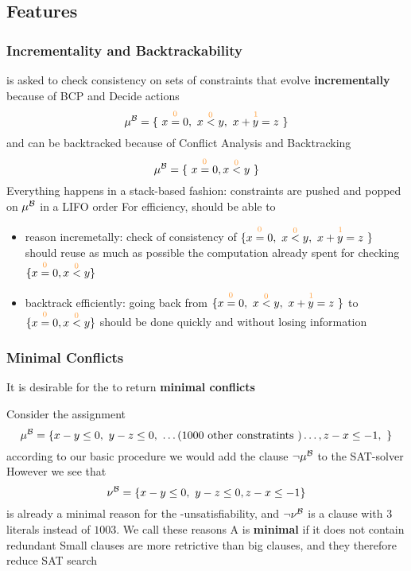 \subsection{\tsolver Features}

\begin{frame}
  \frametitle{Incrementality and Backtrackability}

  \scriptsize

  \tsolver is asked to check consistency on sets of constraints that evolve {\bf incrementally}
  because of BCP and Decide actions
  $$
    \babst{\mu} = \{\ \dec{x = 0}{0},\ \dec{x < y}{0},\ \dec{x + y = z}{1}\ \} 
  $$
  and can be backtracked because of Conflict Analysis and Backtracking
  $$
    \babst{\mu} = \{\ \dec{x = 0}{0}, \dec{x < y}{0}\ \} 
  $$
  \vfill
  \pause
  Everything happens in a stack-based fashion: constraints are pushed and popped on $\mu^{\mathcal{B}}$
  in a LIFO order
  \vfill
  For efficiency, \tsolver should be able to
  \begin{itemize}
    \item reason incremetally: check of consistency of $\{ \dec{x = 0}{0},\ \dec{x < y}{0},\ \dec{x + y = z}{1}\ \}$ should reuse
          as much as possible the computation already spent for checking $\{ \dec{x = 0}{0}, \dec{x < y}{0} \}$
    \pause
    \item backtrack efficiently: going back from $\{ \dec{x = 0}{0},\ \dec{x < y}{0},\ \dec{x + y = z}{1}\ \}$ to
	  $\{ \dec{x = 0}{0}, \dec{x < y}{0} \}$ should be done quickly and without losing information 
  \end{itemize}

\end{frame}

\begin{frame}
  \frametitle{Minimal Conflicts}

  \scriptsize

  It is desirable for the \tsolver to return {\bf minimal conflicts}

  \vfill
  Consider the assignment
  $$\mu^{\mathcal{B}} = \{ x - y \leq 0,\ y - z \leq 0,\  \ldots (1000 \mbox{ other constratints }) \ldots, z - x \leq -1,\ \}$$
  according to our basic procedure we would add the clause $\neg \mu^{\mathcal{B}}$ to the SAT-solver
  \vfill 
  \pause
  However we see that 
  $$\nu^{\mathcal{B}} = \{ x - y \leq 0,\ y - z \leq 0, z - x \leq -1 \}$$ 
  is already a minimal reason for the
  \T-unsatisfiability, and $\neg \nu^{\mathcal{B}}$ is a clause with $3$ literals instead of $1003$.
  We call these reasons \tconflicts
  \vfill
  A \tconflict is {\bf minimal} if it does not contain redundant \tatoms
  \vfill
  \pause
  Small clauses are more retrictive than big clauses, and they therefore reduce SAT search
\end{frame}

